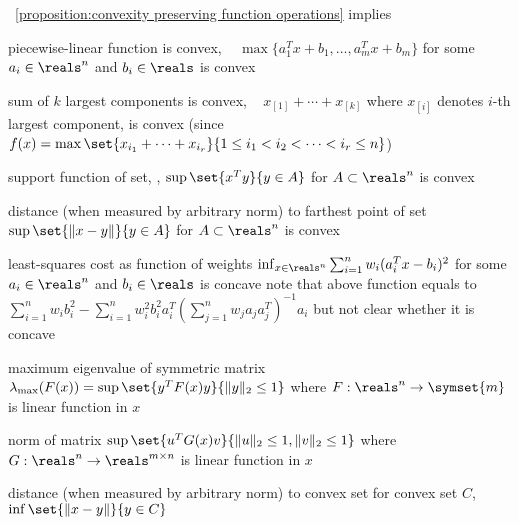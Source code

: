 \documentclass[17pt,landscape]{foils}
\begin{document}
{


\propositionname~\ref{proposition:convexity preserving function operations}
implies
\shrinkspacewithintheoremslikehalf\

\bit
\item
	piecewise-linear function is convex, \ie\
	\bit
	\iitem
		$\max\{a_1^Tx+b_1,\ldots,a_m^T x + b_m\}$
		for some $a_i\in\reals^n$ and $b_i\in\reals$
		is convex
	\eit

\item
	sum of $k$ largest components is convex, \ie\
	\bit
	\iitem
		$x_{[1]} + \cdots + x_{[k]}$
		where $x_{[i]}$ denotes $i$-th largest component,
		is convex
		(since $f(x) = \max\set{x_{i_1}+\cdots+x_{i_r}}{1\leq i_1< i_2<\cdots < i_r\leq n}$)
	\eit

\item
	support function of set, \ie,
	\bit
	\iitem
		$\sup\set{x^Ty}{y\in A}$
		for $A\subset\reals^n$
		is convex
	\eit

\item
	distance (when measured by arbitrary norm) to farthest point of set
	\bit
	\iitem
		$\sup\set{\|x-y\|}{y\in A}$
		for $A\subset\reals^n$
		is convex
	\eit

\item
	least-squares cost as function of weights
	\bit
	\iitem
		$\inf_{x\in\reals^n} \sum^n_{i=1} w_i(a_i^Tx - b_i)^2$ for some $a_i\in\reals^n$ and $b_i\in\reals$
		is concave
		\bit
		\iitem note that above function equals to
			$
				\sum_{i=1}^n w_i b_i^2 - \sum_{i=1}^n w_i^2 b_i^2 a_i^T \left( \sum_{j=1}^n w_ja_ja_j^T\right)^{-1} a_i
			$
			but not clear whether it is concave
		\eit
	\eit
\eit

\myfoilhead{}

\bit

\item
	maximum eigenvalue of symmetric matrix
	\bit
	\iitem
		$\lambda_\mathrm{max}(F(x)) = \sup\set{y^TF(x)y}{\|y\|_2 \leq 1}$
		where $F:\reals^n\to \symset{m}$
		is linear function in $x$
	\eit

\item
	norm of matrix
	\bit
	\iitem
		$\sup\set{u^TG(x)v}{\|u\|_2 \leq 1, \|v\|_2\leq1}$
		where $G:\reals^n\to \reals^{m\times n}$
		is linear function in $x$
	\eit

\item
	distance (when measured by arbitrary norm) to convex set
	\bit
	\iitem
		for convex set $C$,
		$\inf\set{\|x-y\|}{y\in C}$
	\eit

}
\end{document}
